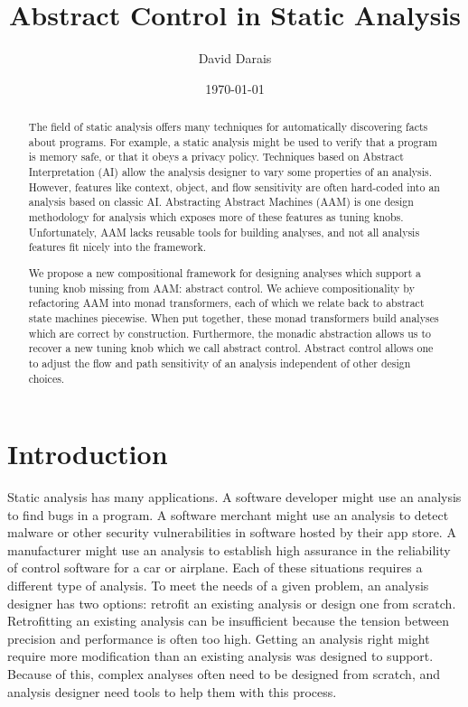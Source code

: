 \documentclass{article}
\title{Abstract Control in Static Analysis}
\author{David Darais}
\date{\today}
\begin{document}
\maketitle


\begin{abstract}

The field of static analysis offers many techniques for automatically discovering facts about programs.
For example, a static analysis might be used to verify that a program is memory safe, or that it obeys a privacy policy.
Techniques based on Abstract Interpretation (AI) allow the analysis designer to vary some properties of an analysis.
However, features like context, object, and flow sensitivity are often hard-coded into an analysis based on classic AI.
Abstracting Abstract Machines (AAM) is one design methodology for analysis which exposes more of these features as tuning knobs.
Unfortunately, AAM lacks reusable tools for building analyses, and not all analysis features fit nicely into the framework.

We propose a new compositional framework for designing analyses which support a tuning knob missing from AAM: abstract control.
We achieve compositionality by refactoring AAM into monad transformers, each of which we relate back to abstract state machines piecewise.
When put together, these monad transformers build analyses which are correct by construction.
Furthermore, the monadic abstraction allows us to recover a new tuning knob which we call abstract control.
Abstract control allows one to adjust the flow and path sensitivity of an analysis independent of other design choices.

\end{abstract}

\tableofcontents

\section{Introduction}
\label{Intro}

Static analysis has many applications.
A software developer might use an analysis to find bugs in a program.
A software merchant might use an analysis to detect malware or other security vulnerabilities in software hosted by their app store.
A manufacturer might use an analysis to establish high assurance in the reliability of control software for a car or airplane.
Each of these situations requires a different type of analysis.
To meet the needs of a given problem, an analysis designer has two options: retrofit an existing analysis or design one from scratch.
Retrofitting an existing analysis can be insufficient because the tension between precision and performance is often too high.
Getting an analysis right might require more modification than an existing analysis was designed to support.
Because of this, complex analyses often need to be designed from scratch, and analysis designer need tools to help them with this process.
\end{document}
